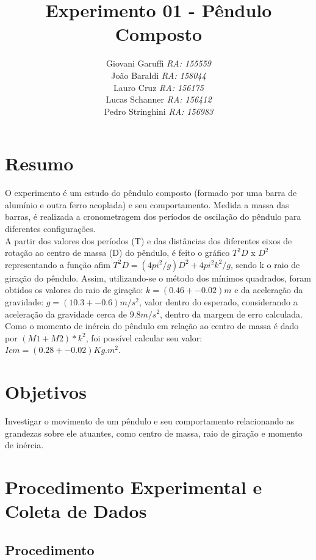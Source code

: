 \documentclass[12pt,a4paper]{article}
\begin{document}
\title{\vspace{70mm}\Huge Experimento 01 - Pêndulo Composto}
\author{ Giovani Garuffi\qquad\hfill
		\textit {RA: 155559}\protect\\
		João Baraldi\hfill
		\textit{RA: 158044}\protect\\
		Lauro Cruz\hfill
		\textit{RA: 156175}\protect\\
		Lucas Schanner\hfill
		\textit{RA: 156412}\protect\\
		Pedro Stringhini\hfill
		\textit {RA: 156983}								
		}
\maketitle
\newpage
\section{Resumo}
O experimento é um estudo do pêndulo composto (formado por uma barra de alumínio e outra ferro acoplada) e seu comportamento. Medida a massa das barras, é realizada a cronometragem dos períodos de oscilação do pêndulo para diferentes configurações.\\
A partir dos valores dos períodos (T) e das distâncias dos diferentes eixos de rotação ao centro de massa (D) do pêndulo, é feito o gráfico $T^2D$ x $D^2$ representando a função afim $T^2D = (4pi^2/g)D^2 + 4pi^2k^2/g$, sendo k o raio de giração do pêndulo. Assim, utilizando-se o método dos mínimos quadrados, foram obtidos os valores do raio de giração: $k = (0.46 +- 0.02)m$ e da aceleração da gravidade: $g = (10.3 +- 0.6) m/s^2$, valor dentro do esperado, considerando a aceleração da gravidade cerca de $9.8 m/s^2$, dentro da margem de erro calculada. Como o momento de inércia do pêndulo em relação ao centro de massa é dado por $(M1 + M2)*k^2$, foi possível calcular seu valor: $Icm = (0.28 +- 0.02)Kg.m^2$.
\section{Objetivos}
Investigar o movimento de um pêndulo e seu comportamento relacionando as grandezas sobre ele atuantes, como centro de massa, raio de giração e momento de inércia.

\section{Procedimento Experimental e Coleta de Dados}
\subsection{Procedimento}
\end{document}
